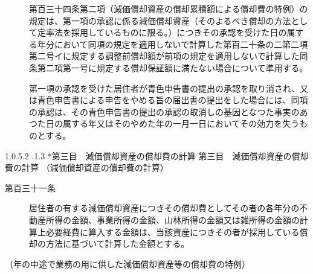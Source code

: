 \documentclass[twocolumn,a4j,10pt]{ltjtarticle}
\makeatletter
\newcommand{\subsubsubsection}{\@startsection{paragraph}{4}{\z@}%
  {1.0\Cvs \@plus.5\Cdp \@minus.2\Cdp}%
  {.1\Cvs \@plus.3\Cdp}%
  {\reset@font\sffamily\normalsize}
}
\makeatother
\begin{document}
\begin{description}
\item[]第百三十四条第二項（減価償却資産の償却累積額による償却費の特例）の規定は、第一項の承認に係る減価償却資産（そのよるべき償却の方法として定率法を採用しているものに限る。）につきその承認を受けた日の属する年分において同項の規定を適用しないで計算した第百二十条の二第二項第二号イに規定する調整前償却額が前項の規定を適用しないで計算した同条第二項第一号に規定する償却保証額に満たない場合について準用する。
\item[]第一項の承認を受けた居住者が青色申告書の提出の承認を取り消され、又は青色申告書による申告をやめる旨の届出書の提出をした場合には、同項の承認は、その青色申告書の提出の承認の取消しの基因となつた事実のあつた日の属する年又はそのやめた年の一月一日においてその効力を失うものとする。
\end{description}
\subsubsubsection*{第三目　減価償却資産の償却費の計算}
{第三目　減価償却資産の償却費の計算}
\noindent\hspace{10pt}（減価償却資産の償却費の計算）
\begin{description}
\item[第百三十一条]居住者の有する減価償却資産につきその償却費としてその者の各年分の不動産所得の金額、事業所得の金額、山林所得の金額又は雑所得の金額の計算上必要経費に算入する金額は、当該資産につきその者が採用している償却の方法に基づいて計算した金額とする。
\end{description}
\noindent\hspace{10pt}（年の中途で業務の用に供した減価償却資産等の償却費の特例）
\end{document}
